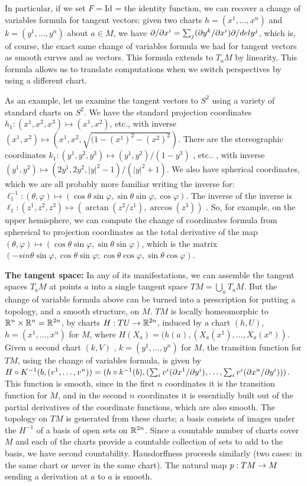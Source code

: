 In particular, if we set $F=$Id = the identity function, we can recover a change of
variables formula for tangent vectors: given two charts $h=(x^1,\ldots ,x^n)$ and
$k=(y^1,\ldots ,y^n)$ about $a\in M$, we have 
$\partial/\partial x^i = \sum_j(\partial y^k/\partial x^i)\partial/del y^j$, which is, of course, the
exact same change of variables formula we had for tangent vectors as smooth
curves and as vectors. This formula extends to $T_aM$ by linearity. This formula
allows us to translate computations when we switch perspectives by using a 
different chart.

\ssk

As an example, let us examine the tangent vectors to $S^2$ using a variety of
standard charts on $S^2$. We have the standard projection coordinates 
$h_1:(x^1,x^2,x^3)\mapsto (x^1,x^2)$, etc., 
with inverse $(x^1,x^2)\mapsto (x^1,x^2,\sqrt{(1-(x^1)^2-(x^2)^2})$.
There are the stereographic coordinates
$k_1:(y^1,y^2,y^3)\mapsto (y^1,y^2)/(1-y^3)$ , etc.. ,
with inverse $(y^1,y^2)\mapsto (2y^1,2y^2,|y|^2-1)/(|y|^2+1)$.
We also have spherical coordinates, 
which we are all probably more familiar writing the inverse for:
$\ell_1^{-1}:(\theta,\varphi)\mapsto (\cos\theta \sin\varphi, \sin\theta \sin\varphi,\cos\varphi)$.
The inverse of the inverse is 
$\ell_1:(z^1,z^2,z^3)\mapsto(\arctan(z^2/z^1),\arccos(z^3))$ .
So, for example, on the upper hemisphere, we can compute the change of coordinates
formula from sphereical to projection coordinates as the total derivative 
of the map $(\theta,\varphi)\mapsto (\cos\theta \sin\varphi,\sin\theta \sin\varphi)$,
which is the matrix $(-sin\theta \sin\varphi,\cos\theta \sin\varphi;\cos\theta \cos\varphi,\sin\theta \cos\varphi)$.

\msk

{\bf The tangent space:} In any of its manifestations, we can assemble the tangent spaces
$T_aM$ at points $a$ into a single tangent space $TM=\bigcup_aT_aM$. But the change of 
variable formula above can be turned into a prescription for putting a topology, and
a smooth structure, on $M$. $TM$ is locally homeomorphic to ${\Bbb R}^n\times {\Bbb R}^n={\Bbb R}^{2n}$,
by charts $H:TU\rightarrow {\Bbb R}^{2n}$, induced by a chart $(h,U)$, $h=(x^1,\ldots ,x^n)$ for $M$, where
$H(X_a)=(h(a),(X_a(x^1),\ldots ,X_a(x^n))$. Given a second chart $(k,V)$ , $k=(y^1,\ldots ,y^n)$
for $M$, the transition function for $TM$, using the change of variables formula, is given by
$H\circ K^{-1}(b,(v^1,\ldots ,v^n))=
(h\circ k^{-1}(b),(\sum_i v^i(\partial x^1/\partial y^i),\ldots ,\sum_iv^i(\partial x^n/\partial y^i)))$.
This function is smooth, since in the first $n$ coordinates it is the transition function
for $M$, and in the second $n$ coordinates it is essentially built out of the partial
derivatives of the coordinate functions, which are also smooth. The topology on $TM$
is generated from these charts; a basis consists of images under the $H^{-1}$ of a basis
of open sets on ${\Bbb R}^{2n}$. Since a countable number of charts cover $M$ and each of
the charts provide a countable collection of sets to add to the basis, we have second
countability. Hausdorffness proceeds similarly (two cases: in the same chart or never in
the same chart). The natural map $p:TM\rightarrow M$ sending a derivation at $a$ to $a$ is smooth.


